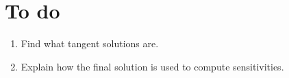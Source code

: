 \documentclass[12pt,twoside,a4paper]{article} %
\begin{document}
\section{To do}

\begin{enumerate}
  \item Find what tangent solutions are.
  \item Explain how the final solution is used to compute sensitivities.
\end{enumerate}





%
%
%
%
%
%
%
%
%
%
%
%
%
%
%
%
%
%
%
\end{document}
